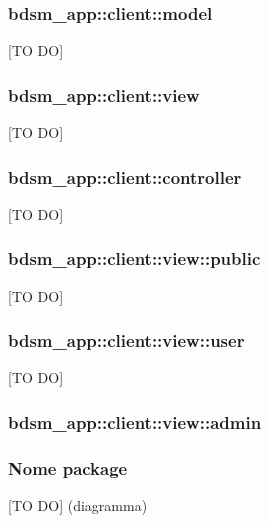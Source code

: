 	\subsubsection{bdsm\_app::client::model} %
	\label{ssub:bdsm_app_client_model}
	[TO DO]

	\subsubsection{bdsm\_app::client::view} %
	\label{ssub:bdsm_app_client_view}
	[TO DO]

	\subsubsection{bdsm\_app::client::controller} %
	\label{ssub:bdsm_app_client_controller}
	[TO DO]



	\subsubsection{bdsm\_app::client::view::public} %
	\label{ssub:bdsm_app_client_view_public}
	[TO DO]

	\subsubsection{bdsm\_app::client::view::user} %
	\label{ssub:bdsm_app_client_view_user}
	[TO DO]

	\subsubsection{bdsm\_app::client::view::admin} %
	\label{ssub:bdsm_app_client_view_admin}
	




	\subsubsection{Nome package} %
	\label{ssub:nome_del_package}
	[TO DO] (diagramma) \newline \newline

